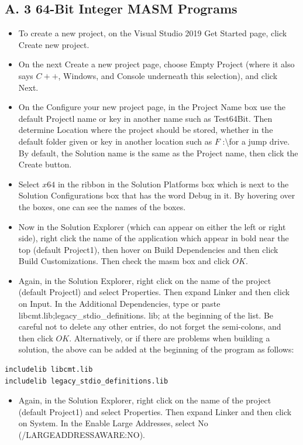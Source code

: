 \documentclass[10pt]{book}
\begin{document}
\begin{center}
\begin{center}
\begin{center}
\begin{center}
\begin{center}
\section*{A. 3 64-Bit Integer MASM Programs}
\begin{itemize}
  \item To create a new project, on the Visual Studio 2019 Get Started page, click Create new project.
  \item On the next Create a new project page, choose Empty Project (where it also says $C++$, Windows, and Console underneath this selection), and click Next.
  \item On the Configure your new project page, in the Project Name box use the default Projectl name or key in another name such as Test64Bit. Then determine Location where the project should be stored, whether in the default folder given or key in another location such as $F$ :\textbackslash for a jump drive. By default, the Solution name is the same as the Project name, then click the Create button.
  \item Select $x 64$ in the ribbon in the Solution Platforms box which is next to the Solution Configurations box that has the word Debug in it. By hovering over the boxes, one can see the names of the boxes.
  \item Now in the Solution Explorer (which can appear on either the left or right side), right click the name of the application which appear in bold near the top (default Project1), then hover on Build Dependencies and then click Build Customizations. Then check the masm box and click $O K$.
  \item Again, in the Solution Explorer, right click on the name of the project (default Projectl) and select Properties. Then expand Linker and then click on Input. In the Additional Dependencies, type or paste libcmt.lib;legacy\_stdio\_definitions. lib; at the beginning of the list. Be careful not to delete any other entries, do not forget the semi-colons, and then click $O K$. Alternatively, or if there are problems when building a solution, the above can be added at the beginning of the program as follows:
\end{itemize}

\begin{verbatim}
includelib libcmt.lib
includelib legacy_stdio_definitions.lib
\end{verbatim}

\begin{itemize}
  \item Again, in the Solution Explorer, right click on the name of the project (default Project1) and select Properties. Then expand Linker and then click on System. In the Enable Large Addresses, select No (/LARGEADDRESSAWARE:NO).
\end{itemize}


\end{center}
\end{center}
\end{center}
\end{center}
\end{center}
\end{document}
